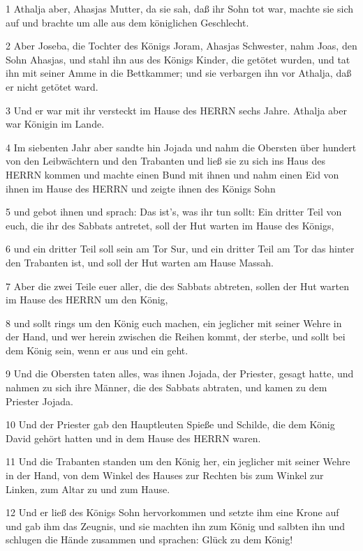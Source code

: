 \par 1 Athalja aber, Ahasjas Mutter, da sie sah, daß ihr Sohn tot war, machte sie sich auf und brachte um alle aus dem königlichen Geschlecht.
\par 2 Aber Joseba, die Tochter des Königs Joram, Ahasjas Schwester, nahm Joas, den Sohn Ahasjas, und stahl ihn aus des Königs Kinder, die getötet wurden, und tat ihn mit seiner Amme in die Bettkammer; und sie verbargen ihn vor Athalja, daß er nicht getötet ward.
\par 3 Und er war mit ihr versteckt im Hause des HERRN sechs Jahre. Athalja aber war Königin im Lande.
\par 4 Im siebenten Jahr aber sandte hin Jojada und nahm die Obersten über hundert von den Leibwächtern und den Trabanten und ließ sie zu sich ins Haus des HERRN kommen und machte einen Bund mit ihnen und nahm einen Eid von ihnen im Hause des HERRN und zeigte ihnen des Königs Sohn
\par 5 und gebot ihnen und sprach: Das ist's, was ihr tun sollt: Ein dritter Teil von euch, die ihr des Sabbats antretet, soll der Hut warten im Hause des Königs,
\par 6 und ein dritter Teil soll sein am Tor Sur, und ein dritter Teil am Tor das hinter den Trabanten ist, und soll der Hut warten am Hause Massah.
\par 7 Aber die zwei Teile euer aller, die des Sabbats abtreten, sollen der Hut warten im Hause des HERRN um den König,
\par 8 und sollt rings um den König euch machen, ein jeglicher mit seiner Wehre in der Hand, und wer herein zwischen die Reihen kommt, der sterbe, und sollt bei dem König sein, wenn er aus und ein geht.
\par 9 Und die Obersten taten alles, was ihnen Jojada, der Priester, gesagt hatte, und nahmen zu sich ihre Männer, die des Sabbats abtraten, und kamen zu dem Priester Jojada.
\par 10 Und der Priester gab den Hauptleuten Spieße und Schilde, die dem König David gehört hatten und in dem Hause des HERRN waren.
\par 11 Und die Trabanten standen um den König her, ein jeglicher mit seiner Wehre in der Hand, von dem Winkel des Hauses zur Rechten bis zum Winkel zur Linken, zum Altar zu und zum Hause.
\par 12 Und er ließ des Königs Sohn hervorkommen und setzte ihm eine Krone auf und gab ihm das Zeugnis, und sie machten ihn zum König und salbten ihn und schlugen die Hände zusammen und sprachen: Glück zu dem König!
